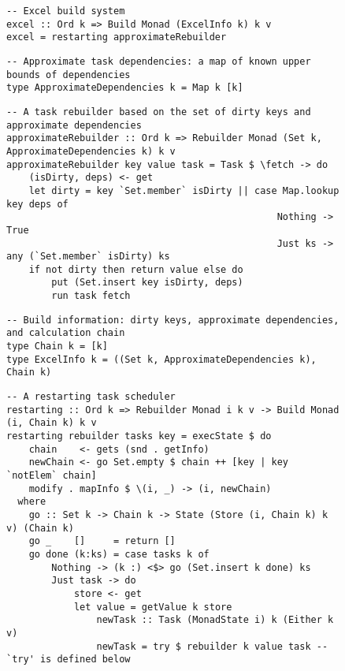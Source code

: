 \begin{figure}
\begin{verbatim}
-- Excel build system
excel :: Ord k => Build Monad (ExcelInfo k) k v
excel = restarting approximateRebuilder
\end{verbatim}
\vspace{1mm}
\begin{verbatim}
-- Approximate task dependencies: a map of known upper bounds of dependencies
type ApproximateDependencies k = Map k [k]
\end{verbatim}
\vspace{1mm}
\begin{verbatim}
-- A task rebuilder based on the set of dirty keys and approximate dependencies
approximateRebuilder :: Ord k => Rebuilder Monad (Set k, ApproximateDependencies k) k v
approximateRebuilder key value task = Task $ \fetch -> do
    (isDirty, deps) <- get
    let dirty = key `Set.member` isDirty || case Map.lookup key deps of
                                                Nothing -> True
                                                Just ks -> any (`Set.member` isDirty) ks
    if not dirty then return value else do
        put (Set.insert key isDirty, deps)
        run task fetch
\end{verbatim}
\vspace{1mm}
\begin{verbatim}
-- Build information: dirty keys, approximate dependencies, and calculation chain
type Chain k = [k]
type ExcelInfo k = ((Set k, ApproximateDependencies k), Chain k)
\end{verbatim}
\vspace{1mm}
\begin{verbatim}
-- A restarting task scheduler
restarting :: Ord k => Rebuilder Monad i k v -> Build Monad (i, Chain k) k v
restarting rebuilder tasks key = execState $ do
    chain    <- gets (snd . getInfo)
    newChain <- go Set.empty $ chain ++ [key | key `notElem` chain]
    modify . mapInfo $ \(i, _) -> (i, newChain)
  where
    go :: Set k -> Chain k -> State (Store (i, Chain k) k v) (Chain k)
    go _    []     = return []
    go done (k:ks) = case tasks k of
        Nothing -> (k :) <$> go (Set.insert k done) ks
        Just task -> do
            store <- get
            let value = getValue k store
                newTask :: Task (MonadState i) k (Either k v)
                newTask = try $ rebuilder k value task -- `try' is defined below

\end{verbatim}
\end{figure}

